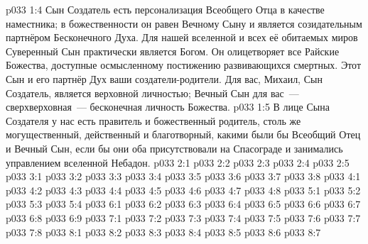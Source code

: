 \vs p033 1:4 Сын Создатель есть персонализация Всеобщего Отца в качестве наместника; в божественности он равен Вечному Сыну и является созидательным партнёром Бесконечного Духа. Для нашей вселенной и всех её обитаемых миров Суверенный Сын практически является Богом. Он олицетворяет все Райские Божества, доступные осмысленному постижению развивающихся смертных. Этот Сын и его партнёр Дух  ваши создатели\hyp{}родители. Для вас, Михаил, Сын Создатель, является верховной личностью; Вечный Сын для вас~--- сверхверховная~--- бесконечная личность Божества.
\vs p033 1:5 \pc В лице Сына Создателя у нас есть правитель и божественный родитель, столь же могущественный, действенный и благотворный, какими были бы Всеобщий Отец и Вечный Сын, если бы они оба присутствовали на Спасограде и занимались управлением вселенной Небадон.
\vs p033 2:1 
\vs p033 2:2 
\vs p033 2:3 \pc 
\vs p033 2:4 
\vs p033 2:5 \pc 
{}
\vs p033 3:1 
\vs p033 3:2 \pc 
\vs p033 3:3 \pc 
\vs p033 3:4 \pc 
\vs p033 3:5 
\vs p033 3:6 
\vs p033 3:7 
\vs p033 3:8 \pc 
{}
\vs p033 4:1 
\vs p033 4:2 
\vs p033 4:3 
\vs p033 4:4 \pc 
\vs p033 4:5 
\vs p033 4:6 
\vs p033 4:7 \pc 
\vs p033 4:8 
\vs p033 5:1 
\vs p033 5:2 
\vs p033 5:3 
\vs p033 5:4 
\vs p033 6:1 
\vs p033 6:2 
\vs p033 6:3 \pc 
\vs p033 6:4 \pc 
\vs p033 6:5 \pc 
\vs p033 6:6 
\vs p033 6:7 \pc 
\vs p033 6:8 
\vs p033 6:9 
\vs p033 7:1 
\vs p033 7:2 
\vs p033 7:3 
\vs p033 7:4 
\vs p033 7:5 
\vs p033 7:6 
\vs p033 7:7 \pc 
\vs p033 7:8 
\vs p033 8:1 
\vs p033 8:2 
\vs p033 8:3 \pc 
\vs p033 8:4 \pc 
\vs p033 8:5 \pc 
\vs p033 8:6 
\vsetoff
\vs p033 8:7 
\quizlink
